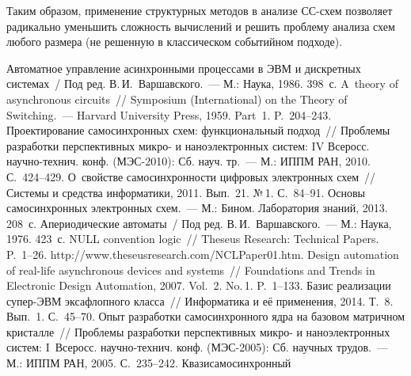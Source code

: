 \begin{multicols}{2}
  Таким образом, применение структурных методов в анализе СС-схем
позволяет радикально уменьшить сложность вычислений и решить проб\-ле\-му
анализа схем любого размера (не решенную в классическом событийном
подходе).

\vspace*{-4pt}

{\small\frenchspacing
 {%

 \vspace*{-2pt}
 \begin{thebibliography}{99}
 Автоматное управление асинхронными процессами в ЭВМ и дискретных системах~/ Под
ред. В.\,И.~Варшавского.~--- М.: Наука, 1986. 398~с.
  A~theory of asynchronous circuits~// Symposium (International)
on the Theory of Switching.~--- Harvard University Press, 1959. Part~1. P.~204--243.
  Проектирование самосинхронных схем: функциональный подход~//
Проблемы разработки перспективных микро- и наноэлектронных сис\-тем: IV Всеросс.
 научно-технич. конф. (МЭС-2010): Сб. науч. тр.~--- М.: ИППМ РАН, 2010.
С.~424--429.
  О~свойстве самосинхронности цифровых электронных схем~//
Системы и средства информатики, 2011. Вып.~21. №\,1. С.~84--91.
  Основы самосинхронных электронных схем.~--- М.: Бином.
Лаборатория знаний, 2013. 208~с.
 Апериодические автоматы~/ Под ред. В.\,И.~Варшавского.~--- М.: Наука, 1976. 423~с.
  NULL convention logic~// Theseus Research: Technical Papers.
P.~1--26. {\sf http://www.theseusresearch.com/NCLPaper01.htm}.
  Design automation of
 real-life asynchronous devices and systems~// Foundations and Trends in Electronic Design
Automation, 2007. Vol.~2. No.\,1. P.~1--133.
  Базис реализации супер-ЭВМ
эксафлопного класса~// Информатика и её применения, 2014. Т.~8. Вып.~1. С.~45--70.
  Опыт разработки
самосинхронного ядра на базовом матричном кристалле~// Проблемы разработки
перспективных микро- и наноэлектронных систем: I~Всеросс. научно-технич. конф.
 (МЭС-2005): Сб. научных трудов.~--- М.: ИППМ РАН, 2005. С.~235--242.
  Квазисамосинхронный

\end{thebibliography}}}
\end{multicols}
